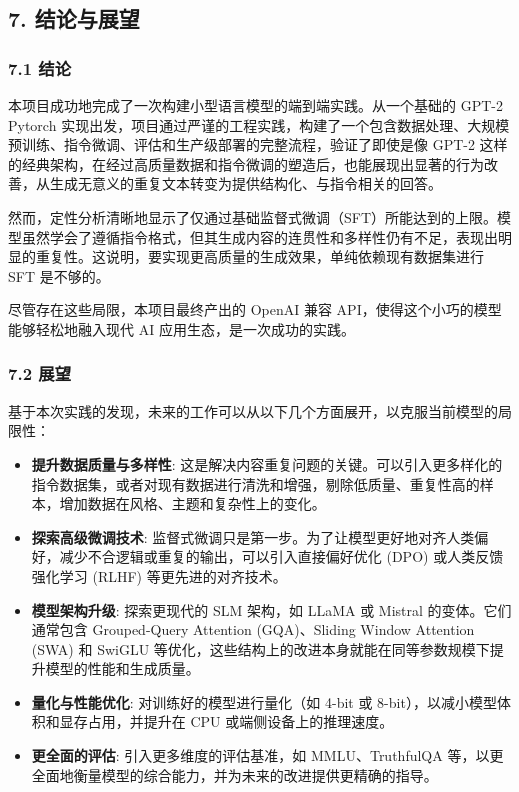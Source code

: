 \documentclass[a4paper]{article}
\providecommand{\tightlist}{%
  \setlength{\itemsep}{0pt}\setlength{\parskip}{0pt}}
\begin{document}
\subsection{7. 结论与展望}\label{ux7ed3ux8bbaux4e0eux5c55ux671b}

\subsubsection{7.1 结论}\label{ux7ed3ux8bba}

本项目成功地完成了一次构建小型语言模型的端到端实践。从一个基础的 GPT-2
Pytorch
实现出发，项目通过严谨的工程实践，构建了一个包含数据处理、大规模预训练、指令微调、评估和生产级部署的完整流程，验证了即使是像
GPT-2
这样的经典架构，在经过高质量数据和指令微调的塑造后，也能展现出显著的行为改善，从生成无意义的重复文本转变为提供结构化、与指令相关的回答。

然而，定性分析清晰地显示了仅通过基础监督式微调（SFT）所能达到的上限。模型虽然学会了遵循指令格式，但其生成内容的连贯性和多样性仍有不足，表现出明显的重复性。这说明，要实现更高质量的生成效果，单纯依赖现有数据集进行
SFT 是不够的。

尽管存在这些局限，本项目最终产出的 OpenAI 兼容
API，使得这个小巧的模型能够轻松地融入现代 AI
应用生态，是一次成功的实践。

\subsubsection{7.2 展望}\label{ux5c55ux671b}

基于本次实践的发现，未来的工作可以从以下几个方面展开，以克服当前模型的局限性：

\begin{itemize}
\tightlist
\item
  \textbf{提升数据质量与多样性}:
  这是解决内容重复问题的关键。可以引入更多样化的指令数据集，或者对现有数据进行清洗和增强，剔除低质量、重复性高的样本，增加数据在风格、主题和复杂性上的变化。
\item
  \textbf{探索高级微调技术}:
  监督式微调只是第一步。为了让模型更好地对齐人类偏好，减少不合逻辑或重复的输出，可以引入直接偏好优化
  (DPO) 或人类反馈强化学习 (RLHF) 等更先进的对齐技术。
\item
  \textbf{模型架构升级}: 探索更现代的 SLM 架构，如 LLaMA 或 Mistral
  的变体。它们通常包含 Grouped-Query Attention (GQA)、Sliding Window
  Attention (SWA) 和 SwiGLU
  等优化，这些结构上的改进本身就能在同等参数规模下提升模型的性能和生成质量。
\item
  \textbf{量化与性能优化}: 对训练好的模型进行量化（如 4-bit 或
  8-bit），以减小模型体积和显存占用，并提升在 CPU
  或端侧设备上的推理速度。
\item
  \textbf{更全面的评估}: 引入更多维度的评估基准，如 MMLU、TruthfulQA
  等，以更全面地衡量模型的综合能力，并为未来的改进提供更精确的指导。
\end{itemize}
\end{document}
